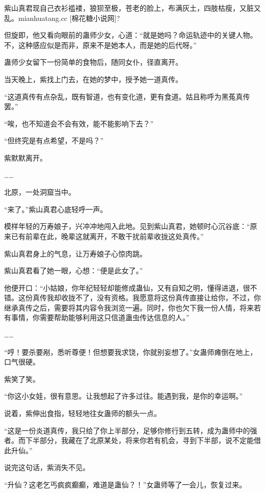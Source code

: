 
\begin{this_body}

紫山真君现自己衣衫褴褛，狼狈至极，苍老的脸上，布满灰土，四肢枯瘦，又脏又乱。mianhuatang.cc [棉花糖小说网]?

但旋即，他又看向眼前的蛊师少女，心道：“就是她吗？命运轨迹中的关键人物。不，这种感应似是而非，原来不是她本人，而是她的后代呀。”

蛊师少女留下一份简单的食物后，随同女仆，径直离开。

当天晚上，紫找上门去，在她的梦中，授予她一道真传。

“这道真传有点杂乱，既有智道，也有变化道，更有食道。姑且称呼为黑菟真传罢。”

“唉，也不知道会不会有效，能不能影响下去？”

“但终究是有点希望，不是吗？”

紫默默离开。

……

北原，一处洞窟当中。

“来了。”紫山真君心底轻呼一声。

模样年轻的万寿娘子，兴冲冲地闯入此地。见到紫山真君，她顿时心沉谷底：“原来已有前辈在此，晚辈这就离开，不敢干扰前辈收拢这处真传。”

紫山真君身上的气息，让万寿娘子心惊肉跳。

紫山真君看了她一眼，心想：“便是此女了。”

他便开口：“小姑娘，你年纪轻轻却能修成蛊仙，又有自知之明，懂得进退，很不错。这份真传我却收拢不了，没有资格。我愿意将这份真传直接让给你，不过，你继承真传之后，需要将其内容令我浏览一遍。同时，你也欠下我一份人情，将来若有事情，你需要帮助能够利用这只信道蛊虫传达信息的人。”

……

“哼！要杀要剐，悉听尊便！但想要我求饶，你就别妄想了。”女蛊师瘫倒在地上，口气很硬。

紫笑了笑。

“你这小女娃，很有意思。让我想起了许多过往。能遇到我，是你的幸运啊。”

说着，紫伸出食指，轻轻地往女蛊师的额头一点。

“这是一份炎道真传，我只给了你上半部分，足够你修行到五转，成为蛊师中的强者。而下半部分，我藏在了北原某处，将来你若有机会，寻到下半部，说不定能借此升仙。”

说完这句话，紫消失不见。

“升仙？这老乞丐疯疯癫癫，难道是蛊仙？！”女蛊师等了一会儿，恢复过来。


\end{this_body}
